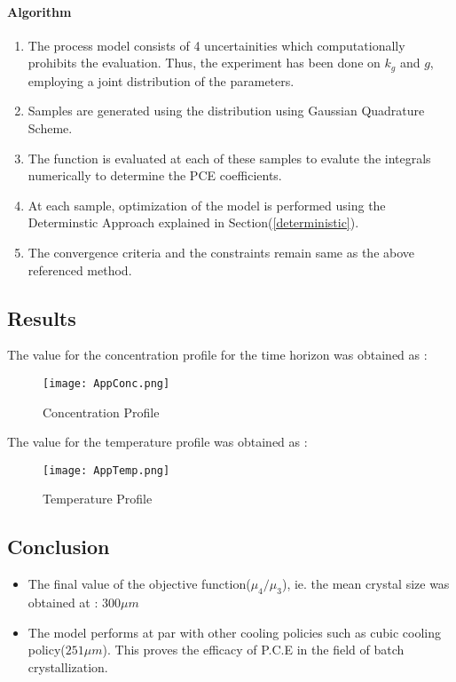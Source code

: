\documentclass[3p,times,authoryear]{elsarticle}
\begin{document}
\paragraph{Algorithm}
\begin{enumerate}
\item The process model consists of 4 uncertainities which computationally prohibits the evaluation. Thus, the experiment has been done on $k_{g}$ and $g$, employing a joint distribution of the parameters.
\item Samples are generated using the distribution using Gaussian Quadrature Scheme.
\item The function is evaluated at each of these samples to evalute the integrals numerically to determine the PCE coefficients.
\item At each sample, optimization of the model is performed using the Determinstic Approach explained in Section(\ref{deterministic}).
\item The convergence criteria and the constraints remain same as the above referenced method.
\end{enumerate}

\subsection{Results}
The value for the concentration profile for the time horizon was obtained as :
\begin{figure}[h!] 
\begin{center}
\texttt{[image: AppConc.png]}
\end{center}
\caption{Concentration Profile}
\end{figure}

The value for the temperature profile was obtained as :
\begin{figure}[h!] 
\begin{center}
\texttt{[image: AppTemp.png]}
\end{center}
\caption{Temperature Profile}
\end{figure}

\subsection{Conclusion}

\begin{itemize}
\item The final value of the objective function($\mu_{4}/\mu_{3}$), ie. the mean crystal size was obtained at : $300 \mu m$
\item The model performs at par with other cooling policies such as cubic cooling policy($251 \mu m$)\cite{bhoi}. This proves the efficacy of P.C.E in the field of batch crystallization.
\end{itemize}
\end{document}
